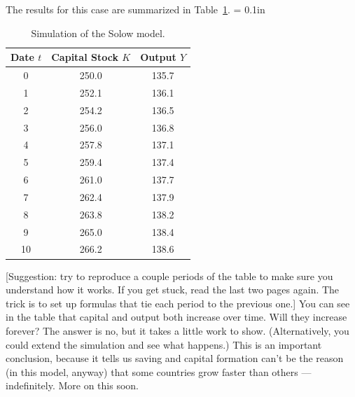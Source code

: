 \documentclass[letterpaper,12pt]{article}
\begin{document}
The results for this case are
summarized in Table~\ref{tab:example}.
%
\tabcolsep = 0.1in
\begin{table}[h]
\begin{center}
\begin{tabular}{ccc}
\toprule
Date $t$  &  Capital Stock $K$ &  Output $Y$ \\
\midrule 
    0 & 250.0 & 135.7 \\
    1 & 252.1 & 136.1 \\
    2 & 254.2 & 136.5 \\
    3 & 256.0 & 136.8 \\
    4 & 257.8 & 137.1 \\
    5 & 259.4 & 137.4 \\
    6 & 261.0 & 137.7 \\
    7 & 262.4 & 137.9 \\
    8 & 263.8 & 138.2 \\
    9 & 265.0 & 138.4 \\
   10\phantom{0} & 266.2 & 138.6 \\
\bottomrule 
\end{tabular}
\end{center}
\caption{Simulation of the Solow model.}
\label{tab:example}
\end{table}
%
[Suggestion:  try to reproduce a couple periods of the table to
make sure you understand how it works.
If you get stuck, read the last two pages again.
The trick is to set up formulas that tie each period to the previous one.]
You can see in the table
that capital and output both increase over time.
Will they increase forever?
The answer is no, but it takes a little work to
show. (Alternatively, you could extend the simulation and see what
happens.)
This is an important conclusion, because it tells us saving
and capital formation can't be the reason
(in this model, anyway)
that some countries grow faster than others --- indefinitely.
More on this soon.
\end{document}
